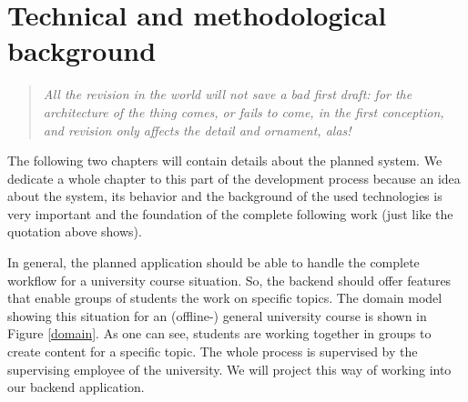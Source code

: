 \chapter[Technical and methodological background]{Technical and methodological background}
\label{background}
  \begin{verse}
    \textit{All the revision in the world will not save a bad first draft: for the architecture of the thing comes, or fails to come, in the first conception, and revision only affects the detail and ornament, alas!}\\
  \end{verse}

The following two chapters will contain details about the planned system. We dedicate a whole chapter to this part of the development process because an idea about the system, its behavior and the background of the used technologies is very important and the foundation of the complete following work (just like the quotation above shows). 

In general, the planned application should be able to handle the complete workflow for a university course situation. So, the backend should offer features that enable groups of students the work on specific topics. The domain model showing this situation for an (offline-) general university course is shown in Figure \ref{domain}. As one can see, students are working together in groups to create content for a specific topic. The whole process is supervised by the supervising employee of the university. We will project this way of working into our backend application.

